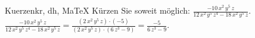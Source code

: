\begin{MAufgabe}{Kuerzen}{kr, dh, MaTeX}
K\"urzen Sie soweit m\"oglich: $\frac{- 10\, x^2\, y^5\, z}{12\, x^2\, y^5\, z^4 - 18\, x^2\, y^5\, z}$.\\ 
\ifLsg\MLoesung
\quad $\frac{- 10\, x^2\, y^5\, z}{12\, x^2\, y^5\, z^4 - 18\, x^2\, y^5\, z}=\frac{(2\, x^2\, y^5\, z)\cdot(-5)}{(2\, x^2\, y^5\, z)\cdot(6\, z^3 - 9)}=\frac{-5}{6\, z^3 - 9}$.\else\relax\fi
 \end{MAufgabe}